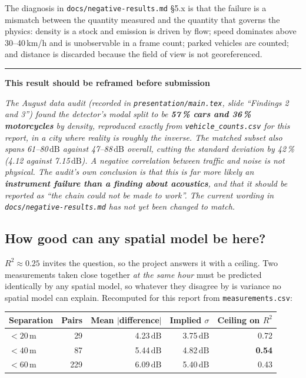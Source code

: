 \documentclass[11pt,a4paper]{article}
\newcommand{\dB}{\ensuremath{\,\mathrm{dB}}}
\newcommand{\pth}[1]{\texttt{\small #1}}
\newenvironment{caveat}[1]
 {\par\medskip\noindent\begin{minipage}{\linewidth}%
 \color{warnc}\rule{2pt}{\baselineskip}\hspace{.6em}\textbf{#1}\par\vspace{.2em}
 \hspace*{1.4em}\begin{minipage}{\dimexpr\linewidth-1.4em\relax}\small\itshape}
 {\end{minipage}\end{minipage}\par\medskip}
\begin{document}
The diagnosis in \pth{docs/negative-results.md} §5.x is that the failure is a
mismatch between the quantity measured and the quantity that governs the physics:
density is a stock and emission is driven by flow; speed dominates above
30--40\,km/h and is unobservable in a frame count; parked vehicles are counted;
and distance is discarded because the field of view is not georeferenced.

\begin{caveat}{This result should be reframed before submission}
The August data audit (recorded in \pth{presentation/main.tex}, slide
``Findings 2 and 3'') found the detector's modal split to be \textbf{57\,\% cars
and 36\,\% motorcycles} by density, reproduced exactly from
\pth{vehicle\_counts.csv} for this report, in a city where reality is roughly
the inverse. The matched subset also spans 61--80\dB{} against 47--88\dB{}
overall, cutting the standard deviation by 42\,\% (4.12 against 7.15\dB). A
negative correlation between traffic and noise is not physical. The audit's own
conclusion is that this is far more likely an \textbf{instrument failure than a
finding about acoustics}, and that it should be reported as ``the chain could not
be made to work''. \emph{The current wording in \pth{docs/negative-results.md}
has not yet been changed to match.}
\end{caveat}

\subsection{How good can any spatial model be here?}\label{sec:ceiling}

$R^2 \approx 0.25$ invites the question, so the project answers it with a
ceiling. Two measurements taken close together \emph{at the same hour} must be
predicted identically by any spatial model, so whatever they disagree by is
variance no spatial model can explain. Recomputed for this report from
\pth{measurements.csv}:

\begin{center}\small
\begin{tabular}{@{}lrrrr@{}}
\toprule
\textbf{Separation} & \textbf{Pairs} & \textbf{Mean $|$difference$|$} &
\textbf{Implied $\sigma$} & \textbf{Ceiling on $R^2$} \\
\midrule
$<20$\,m & 29 & 4.23\dB & 3.75\dB & 0.72 \\
$<40$\,m & 87 & 5.44\dB & 4.82\dB & \textbf{0.54} \\
$<60$\,m & 229 & 6.09\dB & 5.40\dB & 0.43 \\
\bottomrule
\end{tabular}
\end{center}
\end{document}
